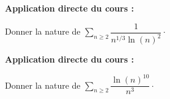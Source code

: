 \documentclass[french,11pt,twoside]{VcCours}
\newenvironment{ApplicationDirecte}{\textbf{Application directe du cours :}

}{}
\newcommand{\Sum}[2]{\ensuremath{\textstyle{\sum\limits_{#1}^{#2}}}}
\begin{document}

\begin{ApplicationDirecte} Donner la nature de $\Sum{n \geq 2}{} \dfrac{1}{n^{1/3} \ln(n)^2} \cdot$
\end{ApplicationDirecte} 

\begin{ApplicationDirecte} Donner la nature de $\Sum{n \geq 2}{} \dfrac{\ln(n)^{10}}{n^{3}} \cdot$
\end{ApplicationDirecte} 


%
%
%
%
%
%
%
%
%
%
%
\end{document}
